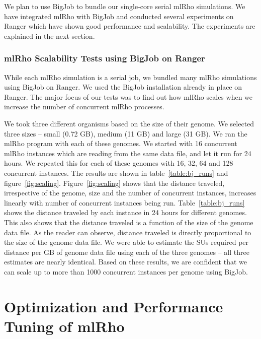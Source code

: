 \documentclass{sig-alternate}
\begin{document}
We plan to use BigJob to bundle our single-core serial mlRho simulations. We have integrated mlRho with BigJob and conducted several experiments on Ranger which have shown good performance and scalability. The experiments are explained in the next section. 


\subsubsection{mlRho Scalability Tests using BigJob on Ranger }
\label{sec:tests}


While each mlRho simulation is a serial job, we bundled many mlRho simulations using BigJob on Ranger. 
We used the BigJob installation already in place on Ranger. The major focus of our tests was to find out how mlRho scales when we increase the number of concurrent mlRho processes. 

We took three different organisms based on the size of their genome. We selected three sizes -- small (0.72 GB), medium (11 GB) and large (31 GB). We ran the mlRho program with each of these genomes. We started with 16 concurrent mlRho instances which are reading from the same data file, and let it run for 24 hours. We repeated this for each of these genomes with 16, 32, 64 and 128 concurrent instances. The results are shown in table~\ref{table:bj_runs} and figure~\ref{fig:scaling}.
Figure~\ref{fig:scaling} shows that the distance traveled, irrespective of the genome, size and the number of concurrent instances, increases linearly with number of concurrent instances being run. Table~\ref{table:bj_runs} shows the distance traveled by each instance in 24 hours for different genomes. This also shows that the distance traveled is a function of the size of the genome data file. As the reader can observe, distance traveled is directly proportional to the size of the genome data file. We were able to estimate the SUs required per distance per GB of genome data file using each of the three genomes -- all three estimates are nearly identical. Based on these results, we are confident that we can scale up to more than 1000 concurrent instances per genome using BigJob.




\section{Optimization and Performance Tuning of mlRho}\label{sec:optimization}
\end{document}
